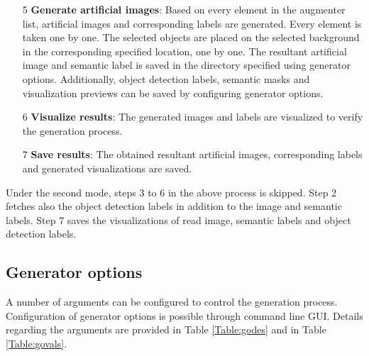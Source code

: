 \begin{itemize}
		\item[5] \textbf{Generate artificial images}: Based on every element in the augmenter list, artificial images and corresponding labels are generated. Every element is taken one by one. The selected objects are placed on the selected background in the corresponding specified location, one by one. The resultant artificial image and semantic label is saved in the directory specified using generator options. Additionally, object detection labels, semantic masks and visualization previews can be saved by configuring generator options.
		\item[6] \textbf{Visualize results}: The generated images and labels are visualized to verify the generation process.
		\item[7] \textbf{Save results}: The obtained resultant artificial images, corresponding labels and generated visualizations are saved.
	\end{itemize}
	
Under the second mode, steps 3 to 6 in the above process is skipped. Step 2 fetches also the object detection labels in addition to the image and semantic labels. Step 7 saves the visualizations of read image, semantic labels and object detection labels.
		

\subsection{Generator options}

A number of arguments can be configured to control the generation process. Configuration of generator options is possible through command line GUI. Details regarding the arguments are provided in Table \ref{Table:godes} and in Table \ref{Table:govals}. 

